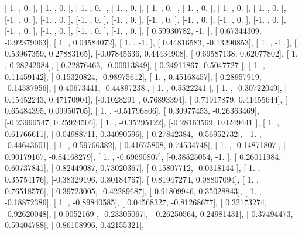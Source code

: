 \documentclass{article}
\begin{document}
       [-1.        ,  0.        ],
       [-1.        ,  0.        ],
       [-1.        ,  0.        ],
       [-1.        ,  0.        ],
       [-1.        ,  0.        ],
       [-1.        ,  0.        ],
       [-1.        ,  0.        ],
       [-1.        ,  0.        ],
       [-1.        ,  0.        ],
       [-1.        ,  0.        ],
       [-1.        ,  0.        ],
       [-1.        ,  0.        ],
       [-1.        ,  0.        ],
       [-1.        ,  0.        ],
       [-1.        ,  0.        ],
       [-1.        ,  0.        ],
       [-1.        ,  0.        ],
       [-1.        ,  0.        ],
       [-1.        ,  0.        ],
       [-1.        ,  0.        ],
       [ 0.59930782, -1.        ],
       [ 0.67344309, -0.92379063],
       [ 1.        ,  0.04584072],
       [ 1.        , -1.        ],
       [ 0.44816583, -0.13290853],
       [ 1.        , -1.        ],
       [ 0.53967359,  0.27883165],
       [-0.07845636,  0.44434908],
       [ 0.69587138,  0.62077802],
       [ 1.        ,  0.28242984],
       [-0.22876463, -0.00913849],
       [ 0.24911867,  0.5047727 ],
       [ 1.        ,  0.11459142],
       [ 0.15320824, -0.98975612],
       [ 1.        ,  0.45168457],
       [ 0.28957919, -0.14587956],
       [ 0.40673441, -0.44897238],
       [ 1.        ,  0.5522241 ],
       [ 1.        , -0.30722049],
       [ 0.15452243,  0.47170904],
       [-0.1028291 ,  0.76893394],
       [ 0.71917879,  0.41455644],
       [ 0.65484395,  0.09950705],
       [ 1.        , -0.51796806],
       [ 0.30977453, -0.26363469],
       [-0.23960547,  0.25924506],
       [ 1.        , -0.35295122],
       [-0.28163569,  0.0249441 ],
       [ 1.        ,  0.61766611],
       [ 0.04988711,  0.34090596],
       [ 0.27842384, -0.56952732],
       [ 1.        , -0.44643601],
       [ 1.        ,  0.59766382],
       [ 0.41675808,  0.74534748],
       [ 1.        , -0.14871807],
       [ 0.90179167, -0.84168279],
       [ 1.        , -0.69690807],
       [-0.38525054, -1.        ],
       [ 0.26011984,  0.60737841],
       [ 0.82449087,  0.73020367],
       [ 0.15807712, -0.0318144 ],
       [ 1.        ,  0.35754176],
       [-0.38329196,  0.80184767],
       [ 0.81947274,  0.08807094],
       [ 1.        ,  0.76518576],
       [-0.39723005, -0.42289687],
       [ 0.91809946,  0.35028843],
       [ 1.        , -0.18872386],
       [ 1.        , -0.89840585],
       [ 0.04568327, -0.81268677],
       [ 0.32173274, -0.92620048],
       [ 0.0052169 , -0.23305067],
       [ 0.26250564,  0.24981431],
       [-0.37494473,  0.59404788],
       [ 0.86108996,  0.42155321],
\end{document}

